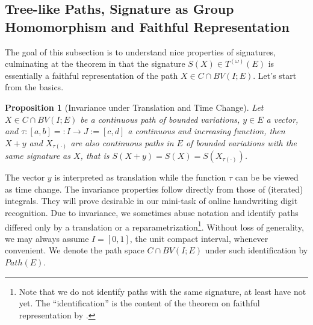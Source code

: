 \documentclass[fleqn]{article}
\newtheorem{prop}[thm]{Proposition}
\theoremstyle{definition}
\theoremstyle{remark}
\begin{document}
\subsection{Tree-like Paths, Signature as Group Homomorphism and Faithful Representation}
The goal of this subsection is to understand nice properties of signatures, culminating at the theorem in \citet{Hambly2005} that the signature $S(X)\in T^{(\omega)}(E)$ is essentially a faithful representation of the path $X\in C\cap BV(I;E)$. Let's start from the basics.
\begin{prop}[Invariance under Translation and Time Change]
Let $X\in C\cap BV(I;E)$ be a continuous path of bounded variations, $y\in E$ a vector, and $\tau:[a,b]=:I\to J:=[c,d]$ a continuous and increasing function, then $X+y$ and $X_{\tau(\cdot)}$ are also continuous paths in $E$ of bounded variations with the same signature as $X$, that is $S(X+y) = S(X) = S\left(X_{\tau(\cdot)}\right)$.
\end{prop}
The vector $y$ is interpreted as translation while the function $\tau$ can be be viewed as time change. The invariance properties follow directly from those of (iterated) integrals. They will prove desirable in our mini-task of online handwriting digit recognition. Due to invariance, we sometimes abuse notation and identify paths differed only by a translation or a reparametrization\footnote{Note that we do not identify paths with the same signature, at least have not yet. The ``identification'' is the content of the theorem on faithful representation by \citeauthor{Hambly2005}.}. Without loss of generality, we may always assume $I=[0,1]$, the unit compact interval, whenever convenient. We denote the path space $C\cap BV(I;E)$ under such identification by $Path(E)$.
\end{document}
